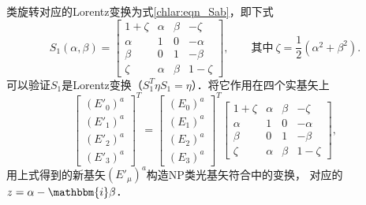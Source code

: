 类旋转对应的Lorentz变换为式\eqref{chlar:eqn_Sab}，即下式
\begin{equation} \label{chnull:eqn_Sab1}
    S_1( {\alpha ,\beta } ) =
    \begin{bmatrix}
        1 + \zeta & \alpha&\beta&{ - \zeta }  \\
        \alpha &   1&0&{ - \alpha }\\
        \beta  &   0&1&{ - \beta  } \\
        \zeta  &   \alpha&\beta&{1 - \zeta }
    \end{bmatrix},
    \qquad \text{其中}\ \zeta = \frac{1}{2}(\alpha^2+\beta^2).
\end{equation}
可以验证$S_1$是Lorentz变换（$S_1^T \eta S_1 = \eta$）．将它作用在四个实基矢上
\begin{equation*}
    \begin{bmatrix}
        (E'_0)^a \\ (E'_1)^a \\ (E'_2)^a \\ (E'_3)^a
    \end{bmatrix}^T =
    \begin{bmatrix}
        (E_0)^a \\ (E_1)^a \\ (E_2)^a \\ (E_3)^a
    \end{bmatrix} ^T
    \begin{bmatrix}
        1 + \zeta & \alpha&\beta&{ - \zeta }  \\
        \alpha &   1&0&{ - \alpha }\\
        \beta  &   0&1&{ - \beta  } \\
        \zeta  &   \alpha&\beta&{1 - \zeta }
    \end{bmatrix},
\end{equation*}
用上式得到的新基矢$(E'_\mu)^a$构造NP类光基矢符合中的变换，
对应的$z=\alpha -\mathbbm{i} \beta$．

